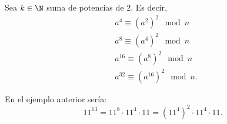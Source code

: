 \begin{ftheorem}
\normalfont Sea $\displaystyle k\in\N $ suma de potencias de 2. Es decir, 
\[
\begin{split}
& a^{4} \equiv \left(a^{2}\right)^{2} \mod n \\
& a^{8} \equiv \left(a^{4}\right)^{2} \mod n \\
& a^{16} \equiv \left(a^{8}\right)^{2} \mod n \\
& a^{32} \equiv \left(a^{16}\right)^{2} \mod n.
\end{split}
\]
\end{ftheorem}

\begin{eg}
\normalfont En el ejemplo anterior sería:
\[11^{13} = 11^{8} \cdot 11^{4} \cdot 11 = \left(11^{4}\right)^{2} \cdot 11^{4} \cdot 11 .\]
\end{eg}

